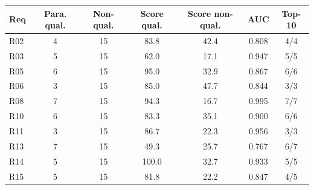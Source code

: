 \begin{tabular}{lcccccc}
\toprule
Req & Para. qual. & Non-qual. & Score qual. & Score non-qual. & AUC & Top-10 \\
\midrule
R02 & 4 & 15 & 83.8 & 42.4 & 0.808 & 4/4 \\
R03 & 5 & 15 & 62.0 & 17.1 & 0.947 & 5/5 \\
R05 & 6 & 15 & 95.0 & 32.9 & 0.867 & 6/6 \\
R06 & 3 & 15 & 85.0 & 47.7 & 0.844 & 3/3 \\
R08 & 7 & 15 & 94.3 & 16.7 & 0.995 & 7/7 \\
R10 & 6 & 15 & 83.3 & 35.1 & 0.900 & 6/6 \\
R11 & 3 & 15 & 86.7 & 22.3 & 0.956 & 3/3 \\
R13 & 7 & 15 & 49.3 & 25.7 & 0.767 & 6/7 \\
R14 & 5 & 15 & 100.0 & 32.7 & 0.933 & 5/5 \\
R15 & 5 & 15 & 81.8 & 22.2 & 0.847 & 4/5 \\
\bottomrule
\end{tabular}
